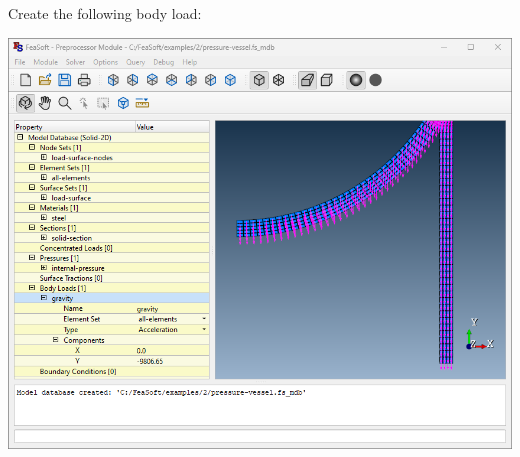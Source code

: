 \documentclass[
    11pt,        %
    a4paper,     %
    final,       %
    fleqn,       %
    notitlepage, %
    onecolumn,   %
    oneside,     %
]{article}
\begin{document}
Create the following body load:
\begin{center}
\end{center}
\begin{center}
    \includegraphics[scale=0.5]{fig/ui-2-9.png}
\end{center}
\end{document}
